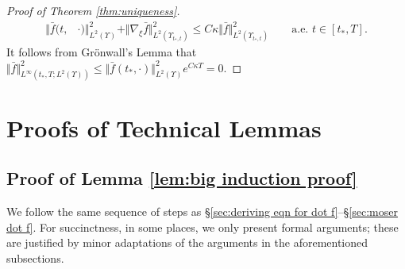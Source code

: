 \documentclass[11pt,a4paper,reqno]{amsart}
\theoremstyle{remark}
\theoremstyle{definition}
\numberwithin{equation}{section}
\newcommand{\bxi}{\xi}
\begin{document}
\begin{proof}[Proof of Theorem \ref{thm:uniqueness}]
\begin{equation*}
    \begin{aligned}
        \Vert\bar{f}(t,&\cdot)\Vert_{L^2(\Upsilon)}^2 + \Vert \nabla_{\bxi} \bar{f} \Vert_{L^2(\Upsilon_{t_*,t})}^2 \leq C \kappa \Vert \bar{f} \Vert_{L^2(\Upsilon_{t_*,t})}^2 \qquad \text{a.e.~}t \in [t_*,T]. 
    \end{aligned}
\end{equation*}
It follows from Gr\"onwall's Lemma that $\Vert\bar{f}\Vert_{L^\infty(t_*,T;L^2(\Upsilon))}^2  \leq \Vert\bar{f}(t_*,\cdot)\Vert_{L^2(\Upsilon)}^2 e^{C\kappa T}=0$.
\end{proof}








\appendix

\section{Proofs of Technical Lemmas}\label{sec:appendix}






\subsection{Proof of Lemma \ref{lem:big induction proof}}\label{app: proof of big induction}

We follow the same sequence of steps as \S \ref{sec:deriving eqn for dot f}--\S \ref{sec:moser dot f}. For succinctness, in some places, we only present formal arguments; these are justified by minor adaptations of the arguments in the aforementioned subsections. 
\end{document}

